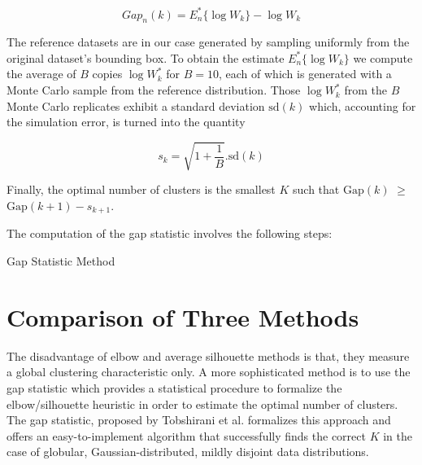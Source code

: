 $$Gap_n(k) = E_n^{*}\{\log W_k\} - \log W_k$$


The reference datasets are in our case generated by sampling uniformly from the original dataset’s bounding box.
To obtain the estimate $E_n^*\{\log W_k\}$ we compute the average of $B$ copies $\log W^*_k$ for $B=10$, each of
which is generated with a Monte Carlo sample from the reference distribution. Those $\log W^*_k$ from the $B$
Monte Carlo replicates exhibit a standard deviation $\mathrm{sd}(k)$ which, accounting for the simulation error,
is turned into the quantity

$$s_k = \sqrt{1+\frac{1}{B}} . \mathrm{sd}(k)$$

Finally, the optimal number of clusters is the smallest $K$ such that
$\mathrm{Gap}(k)$ $\geq$ $\mathrm{Gap}(k+1) - s_{k+1}$.

The computation of the gap statistic involves the following steps:

\begin{algorithm}
  \caption{Gap Statistic Method}
  \label{alg3}
  \begin{algorithmic}
    
  \end{algorithmic}
\end{algorithm}

\section{Comparison of Three Methods}
The disadvantage of elbow and average silhouette methods is that, they measure a global clustering
characteristic only. A more sophisticated method is to use the gap statistic which provides a statistical
procedure to formalize the elbow/silhouette heuristic in order to estimate the optimal number of clusters.
The gap statistic, proposed by Tobshirani et al. formalizes this approach and offers an easy-to-implement
algorithm that successfully finds the correct $K$ in the case of globular, Gaussian-distributed, mildly
disjoint data distributions.

\endinput

